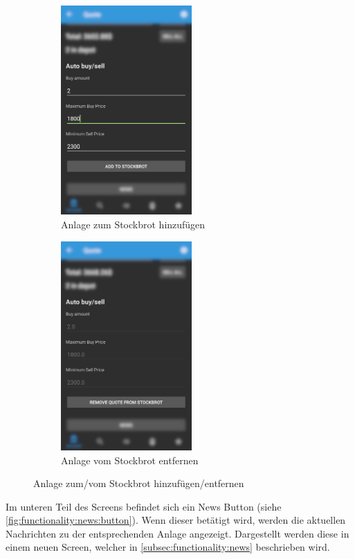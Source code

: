 \documentclass[a4paper]{article}
\begin{document}
\begin{figure}[H]
    \begin{subfigure}{.5\textwidth}
        \centering
        \includegraphics[height=8cm,keepaspectratio]{./images/stockbrot_add_before.png}
        \caption{Anlage zum Stockbrot hinzufügen}
        \label{fig:functionality:stockbrot:add}
    \end{subfigure}
    \begin{subfigure}{.5\textwidth}
        \centering
        \includegraphics[height=8cm,keepaspectratio]{./images/stockbrot_add_after.png}
        \caption{Anlage vom Stockbrot entfernen}
        \label{fig:functionality:stockbrot:remove}
    \end{subfigure}
    \caption{Anlage zum/vom Stockbrot hinzufügen/entfernen}
    \label{fig:functionality:stockbrot:addremove}
\end{figure}

Im unteren Teil des Screens befindet sich ein News Button (siehe \autoref{fig:functionality:news:button}). Wenn dieser betätigt wird, werden die aktuellen Nachrichten zu der entsprechenden Anlage angezeigt. Dargestellt werden diese in einem neuen Screen, welcher in \autoref{subsec:functionality:news} beschrieben wird.
\end{document}
